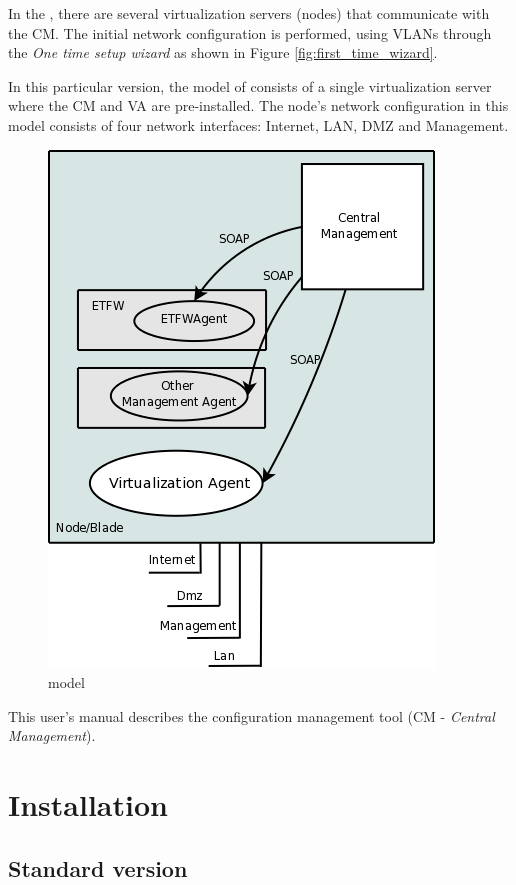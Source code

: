 In the \acronym, there are several virtualization servers (nodes) that communicate with the CM. The initial network configuration is performed, using VLANs through the \emph{One time setup wizard} as shown in Figure \ref{fig:first_time_wizard}.

In this particular version, the model of \acronym consists of a single virtualization server where the CM and VA are pre-installed. The node's network configuration in this model consists of four network interfaces: Internet, LAN, DMZ and Management.

\begin{figure}[H]
    \begin{center}
	\includegraphics[scale=0.4]{screenshots/etva_standard.png}
	\caption{\acronym model}
	\label{fig:etva_standard}
	\end{center}
\end{figure}

This user's manual describes the configuration management tool (CM - \emph{Central Management}). 

\pagebreak
\chapter{\textsf{Installation}}
\label{chp:installation}
\section{Standard version}

